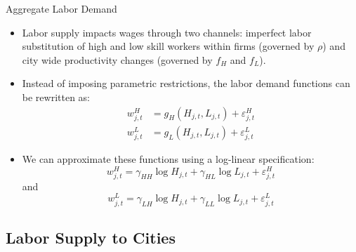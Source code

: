 \documentclass[aspectratio=169]{beamer}
\begin{document}
\begin{frame}{Aggregate Labor Demand}

\begin{itemize}
    \item<1-> Labor supply impacts wages through two channels: imperfect labor substitution of high and low skill workers within firms (governed by $ \rho $) and city wide productivity changes (governed by $ f_H $ and $ f_L $).
    \item<2-> Instead of imposing parametric restrictions, the labor demand functions can be rewritten as: \begin{equation*}
        \begin{split}
            w_{j,t}^{H} &= g_{H}\left( H_{j,t}, L_{j,t} \right) + \varepsilon_{j,t}^{H} \\
            w_{j,t}^{L} &= g_{L}\left( H_{j,t}, L_{j,t} \right) + \varepsilon_{j,t}^{L}
        \end{split}
    \end{equation*}
    \item<2-> We can approximate these functions using a log-linear specification:
    \begin{equation*}
        w_{j,t}^{H} = \gamma_{HH} \log{H_{j,t}} + \gamma_{HL} \log{L_{j,t}} + \varepsilon_{j,t}^{H}
    \end{equation*}
    and
    \begin{equation*}
        w_{j,t}^{L} = \gamma_{LH} \log{H_{j,t}} + \gamma_{LL} \log{L_{j,t}} + \varepsilon_{j,t}^{L}
    \end{equation*}
\end{itemize}
    
\end{frame}


\subsection{Labor Supply to Cities}

\end{document}
